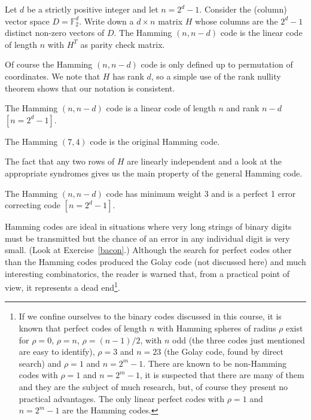 \begin{definition} Let $d$ be a strictly
positive integer and let $n=2^{d}-1$.
Consider the  (column) vector
space $D={\mathbb F}_{2}^{d}$. Write down
a $d\times n$ matrix $H$ whose columns
are the $2^{d}-1$ distinct non-zero vectors
of $D$. The Hamming $(n,n-d)$ code is
the linear code of length $n$ with $H^{T}$
as parity check matrix.
\end{definition}

Of course the Hamming $(n,n-d)$ code is only
defined up to permutation of coordinates.
We note that $H$ has rank $d$, so a simple
use of the rank nullity theorem shows
that our notation is consistent.
\begin{lemma}  The Hamming $(n,n-d)$ code is
a linear code of length $n$ and rank $n-d$ $[n=2^{d}-1]$.
\end{lemma}
\begin{example} The Hamming $(7,4)$ code
is the original Hamming code.
\end{example}

The fact that any two rows of $H$ are linearly
independent and a look at the appropriate syndromes
gives us the main property of the general Hamming code.
\begin{lemma} The Hamming $(n,n-d)$ code
has minimum weight $3$ and is a perfect
1 error correcting code $[n=2^{d}-1]$.
\end{lemma}
Hamming codes are ideal in situations where
very long strings of binary digits must be transmitted
but the chance of an error in any individual
digit is very small. (Look at Exercise~\ref{bacon}.)
Although the search for perfect codes other than the Hamming codes
produced
the Golay code (not discussed here) and much interesting
combinatorics, the reader is warned that, from a practical
point of view, it represents a dead
end\footnote{If we confine ourselves to the  binary
codes discussed in this course, it is known
that perfect codes of length $n$ with Hamming spheres of radius
$\rho$ exist for $\rho=0$, $\rho=n$, $\rho=(n-1)/2$,
with $n$ odd (the three codes just mentioned are
easy to identify), $\rho=3$ and $n=23$ (the Golay code,
found by direct search) and $\rho=1$ and $n=2^{m}-1$.
There are known to be non-Hamming codes with  $\rho=1$ and $n=2^{m}-1$,
it is suspected that there are many of them and
they are the subject of much research, but,
of course they present no practical advantages.
The only linear perfect codes with $\rho=1$ and $n=2^{m}-1$
are the Hamming codes.}.

